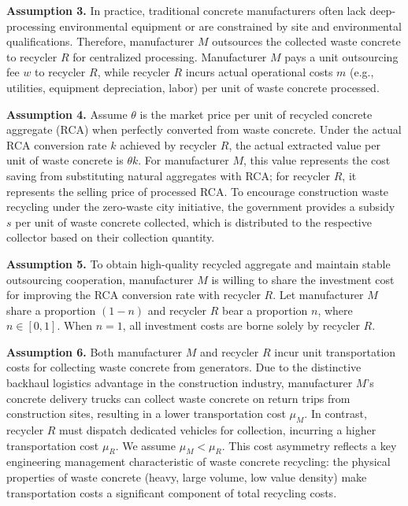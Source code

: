 \documentclass[authoryear,preprint,review,times,10pt]{elsarticle}
\begin{document}
\textbf{Assumption 3.} In practice, traditional concrete manufacturers often lack deep-processing environmental equipment or are constrained by site and environmental qualifications. Therefore, manufacturer $M$ outsources the collected waste concrete to recycler $R$ for centralized processing. Manufacturer $M$ pays a unit outsourcing fee $w$ to recycler $R$, while recycler $R$ incurs actual operational costs $m$ (e.g., utilities, equipment depreciation, labor) per unit of waste concrete processed.

\textbf{Assumption 4.} Assume $\theta$ is the market price per unit of recycled concrete aggregate (RCA) when perfectly converted from waste concrete. Under the actual RCA conversion rate $k$ achieved by recycler $R$, the actual extracted value per unit of waste concrete is $\theta k$. For manufacturer $M$, this value represents the cost saving from substituting natural aggregates with RCA; for recycler $R$, it represents the selling price of processed RCA. To encourage construction waste recycling under the zero-waste city initiative, the government provides a subsidy $s$ per unit of waste concrete collected, which is distributed to the respective collector based on their collection quantity.

\textbf{Assumption 5.} To obtain high-quality recycled aggregate and maintain stable outsourcing cooperation, manufacturer $M$ is willing to share the investment cost for improving the RCA conversion rate with recycler $R$. Let manufacturer $M$ share a proportion $(1-n)$ and recycler $R$ bear a proportion $n$, where $n \in [0,1]$. When $n=1$, all investment costs are borne solely by recycler $R$.

\textbf{Assumption 6.} Both manufacturer $M$ and recycler $R$ incur unit transportation costs for collecting waste concrete from generators. Due to the distinctive backhaul logistics advantage in the construction industry, manufacturer $M$'s concrete delivery trucks can collect waste concrete on return trips from construction sites, resulting in a lower transportation cost $\mu_M$. In contrast, recycler $R$ must dispatch dedicated vehicles for collection, incurring a higher transportation cost $\mu_R$. We assume $\mu_M < \mu_R$. This cost asymmetry reflects a key engineering management characteristic of waste concrete recycling: the physical properties of waste concrete (heavy, large volume, low value density) make transportation costs a significant component of total recycling costs.
\end{document}
